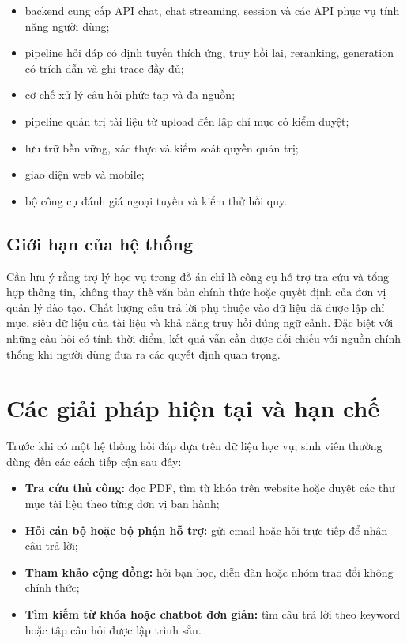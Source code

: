 \documentclass[../DoAn.tex]{subfiles}
\begin{document}
\begin{itemize}
    \item backend cung cấp API chat, chat streaming, session và các API phục vụ
    tính năng người dùng;
    \item pipeline hỏi đáp có định tuyến thích ứng, truy hồi lai, reranking,
    generation có trích dẫn và ghi trace đầy đủ;
    \item cơ chế xử lý câu hỏi phức tạp và đa nguồn;
    \item pipeline quản trị tài liệu từ upload đến lập chỉ mục có kiểm duyệt;
    \item lưu trữ bền vững, xác thực và kiểm soát quyền quản trị;
    \item giao diện web và mobile;
    \item bộ công cụ đánh giá ngoại tuyến và kiểm thử hồi quy.
\end{itemize}

\subsection{Giới hạn của hệ thống}

Cần lưu ý rằng trợ lý học vụ trong đồ án chỉ là công cụ hỗ trợ tra cứu và tổng
hợp thông tin, không thay thế văn bản chính thức hoặc quyết định của đơn vị
quản lý đào tạo. Chất lượng câu trả lời phụ thuộc vào dữ liệu đã được lập chỉ
mục, siêu dữ liệu của tài liệu và khả năng truy hồi đúng ngữ cảnh. Đặc biệt
với những câu hỏi có tính thời điểm, kết quả vẫn cần được đối chiếu với nguồn
chính thống khi người dùng đưa ra các quyết định quan trọng.

\section{Các giải pháp hiện tại và hạn chế}
\label{sec:giaiphap}

Trước khi có một hệ thống hỏi đáp dựa trên dữ liệu học vụ, sinh viên thường
dùng đến các cách tiếp cận sau đây:

\begin{itemize}
    \item \textbf{Tra cứu thủ công:} đọc PDF, tìm từ khóa trên website hoặc
    duyệt các thư mục tài liệu theo từng đơn vị ban hành;
    \item \textbf{Hỏi cán bộ hoặc bộ phận hỗ trợ:} gửi email hoặc hỏi trực
    tiếp để nhận câu trả lời;
    \item \textbf{Tham khảo cộng đồng:} hỏi bạn học, diễn đàn hoặc nhóm trao
    đổi không chính thức;
    \item \textbf{Tìm kiếm từ khóa hoặc chatbot đơn giản:} tìm câu trả lời
    theo keyword hoặc tập câu hỏi được lập trình sẵn.
\end{itemize}
\end{document}
